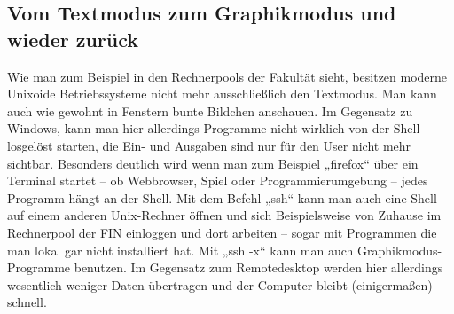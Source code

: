 \subsection{Vom Textmodus zum Graphikmodus und wieder zurück}
Wie man zum Beispiel in den Rechnerpools der Fakultät sieht, besitzen moderne Unixoide Betriebssysteme nicht mehr ausschließlich den Textmodus. Man kann auch wie gewohnt in Fenstern bunte Bildchen anschauen.
Im Gegensatz zu Windows, kann man hier allerdings Programme nicht wirklich von der Shell losgelöst starten, die Ein- und Ausgaben sind nur für den User nicht mehr sichtbar. Besonders deutlich wird wenn man zum Beispiel „firefox“ über ein Terminal startet – ob Webbrowser, Spiel oder Programmierumgebung – jedes Programm hängt an der Shell.
Mit dem Befehl „ssh“ kann man auch eine Shell auf einem anderen Unix-Rechner öffnen und sich Beispielsweise von Zuhause im Rechnerpool der FIN einloggen und dort arbeiten – sogar mit Programmen die man lokal gar nicht installiert hat. Mit „ssh -x“ kann man auch Graphikmodus-Programme benutzen.
Im Gegensatz zum Remotedesktop werden hier allerdings wesentlich weniger Daten übertragen und der Computer bleibt (einigermaßen) schnell.
